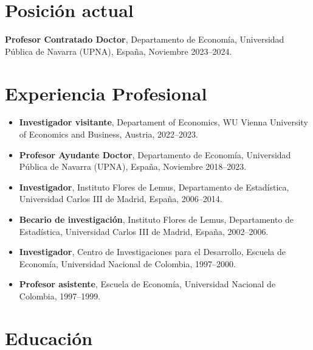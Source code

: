 \documentclass[11pt]{article}\usepackage[]{graphicx}\usepackage[usenames,dvipsnames]{xcolor}
\begin{document}
{%
\section{Posición actual} 

\begin{itemize}
\textbf{Profesor Contratado Doctor}, Departamento de Economía, Universidad Pública de Navarra (UPNA), España, Noviembre 2023--2024.
\end{itemize}

\section{Experiencia Profesional} 

\begin{itemize}
  \item\textbf{Investigador visitante}, Departament of Economics, WU Vienna University of Economics and Business, Austria, 2022--2023.
  \item\textbf{Profesor Ayudante Doctor}, Departamento de Economía, Universidad Pública de Navarra (UPNA), España, Noviembre 2018--2023.
  \item \textbf{Investigador}, Instituto Flores de Lemus, Departamento de Estadística, Universidad Carlos III de Madrid, España, 2006--2014.
  \item \textbf{Becario de investigación}, Instituto Flores de Lemus, Departamento de Estadística, Universidad Carlos III de Madrid, España, 2002--2006.
  \item \textbf{Investigador}, Centro de Investigaciones para el Desarrollo, Escuela de Economía, Universidad Nacional de Colombia, 1997--2000.
  \item \textbf{Profesor asistente}, Escuela de Economía, Universidad Nacional de Colombia, 1997--1999.
\end{itemize}

\section{Educación} 

}
\end{document}
